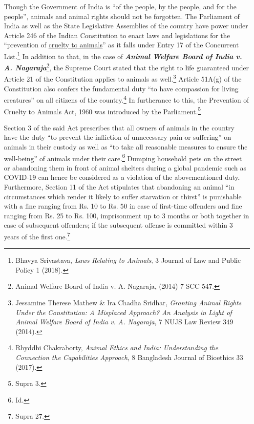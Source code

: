 \begin{multicols}{2}
\noi
Though the Government of India is “of the people, by the people, and for the people”,
animals and animal rights should not be forgotten. The Parliament of India as well as the
State Legislative Assemblies of the country have power under Article 246 of the Indian
Constitution to enact laws and legislations for the “prevention of \underline{cruelty to animals}” as it falls
under Entry 17 of the Concurrent List.\footnote{Bhavya Srivastava, \textit{Laws Relating to Animals}, 3 Journal of Law and Public Policy 1 (2018).} In addition to that, in the case of {\it {\bfseries Animal Welfare
Board of India v. A. Nagaraja}}\footnote{Animal Welfare Board of India v. A. Nagaraja, (2014) 7 SCC 547.}, the Supreme Court stated that the right to life guaranteed
under Article 21 of the Constitution applies to animals as well.\footnote{Jessamine Therese Mathew \& Ira Chadha Sridhar, \textit{Granting Animal Rights Under the Constitution: A Misplaced Approach? An Analysis in Light of Animal Welfare Board of India v. A. Nagaraja}, 7 NUJS Law Review 349 (2014).} Article 51A(g) of the
Constitution also confers the fundamental duty “to have compassion for living creatures” on
all citizens of the country.\footnote{Rhyddhi Chakraborty, \textit{Animal Ethics and India: Understanding the Connection the Capabilities Approach}, 8
Bangladesh Journal of Bioethics 33 (2017).} In furtherance to this, the Prevention of Cruelty to Animals Act,
1960 was introduced by the Parliament.\footnote{Supra 3.}

\noi
Section 3 of the said Act prescribes that all owners of animals in the country have the duty
“to prevent the infliction of unnecessary pain or suffering” on animals in their custody as well
as “to take all reasonable measures to ensure the well-being” of animals under their care.\footnote{Id.}
Dumping household pets on the street or abandoning them in front of animal shelters during a
global pandemic such as COVID-19 can hence be considered as a violation of the abovementioned duty. Furthermore, Section 11 of the Act stipulates that abandoning an animal “in
circumstances which render it likely to suffer starvation or thirst” is punishable with a fine
ranging from Rs. 10 to Rs. 50 in case of first-time offenders and fine ranging from Rs. 25 to Rs. 100, imprisonment up to 3 months or both together in case of subsequent offenders; if the
subsequent offense is committed within 3 years of the first one.\footnote{Supra 27.}


\end{multicols}
